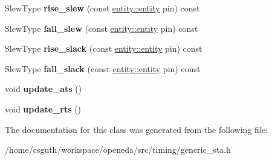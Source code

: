 \begin{DoxyCompactItemize}
\item 
\hypertarget{classophidian_1_1timing_1_1generic__sta_abd6c368e8f7fec86bc77dc9f9b760a6d}{Slew\-Type {\bfseries rise\-\_\-slew} (const \hyperlink{classophidian_1_1entity_1_1entity}{entity\-::entity} pin) const }\label{classophidian_1_1timing_1_1generic__sta_abd6c368e8f7fec86bc77dc9f9b760a6d}

\item 
\hypertarget{classophidian_1_1timing_1_1generic__sta_ab450a9b45eed360c9ffd64677ce699f7}{Slew\-Type {\bfseries fall\-\_\-slew} (const \hyperlink{classophidian_1_1entity_1_1entity}{entity\-::entity} pin) const }\label{classophidian_1_1timing_1_1generic__sta_ab450a9b45eed360c9ffd64677ce699f7}

\item 
\hypertarget{classophidian_1_1timing_1_1generic__sta_a5dbde3bc77aeb9b0017ba7fac911d209}{Slew\-Type {\bfseries rise\-\_\-slack} (const \hyperlink{classophidian_1_1entity_1_1entity}{entity\-::entity} pin) const }\label{classophidian_1_1timing_1_1generic__sta_a5dbde3bc77aeb9b0017ba7fac911d209}

\item 
\hypertarget{classophidian_1_1timing_1_1generic__sta_a91d6e96212fa521eb9c23bff5bffa992}{Slew\-Type {\bfseries fall\-\_\-slack} (const \hyperlink{classophidian_1_1entity_1_1entity}{entity\-::entity} pin) const }\label{classophidian_1_1timing_1_1generic__sta_a91d6e96212fa521eb9c23bff5bffa992}

\item 
\hypertarget{classophidian_1_1timing_1_1generic__sta_ae9cf6c1e7fdcc7231f50a80bc51fc763}{void {\bfseries update\-\_\-ats} ()}\label{classophidian_1_1timing_1_1generic__sta_ae9cf6c1e7fdcc7231f50a80bc51fc763}

\item 
\hypertarget{classophidian_1_1timing_1_1generic__sta_a72cd9fcb49e2690b491dcbaae360a200}{void {\bfseries update\-\_\-rts} ()}\label{classophidian_1_1timing_1_1generic__sta_a72cd9fcb49e2690b491dcbaae360a200}

\end{DoxyCompactItemize}


The documentation for this class was generated from the following file\-:\begin{DoxyCompactItemize}
\item 
/home/csguth/workspace/openeda/src/timing/generic\-\_\-sta.\-h\end{DoxyCompactItemize}
